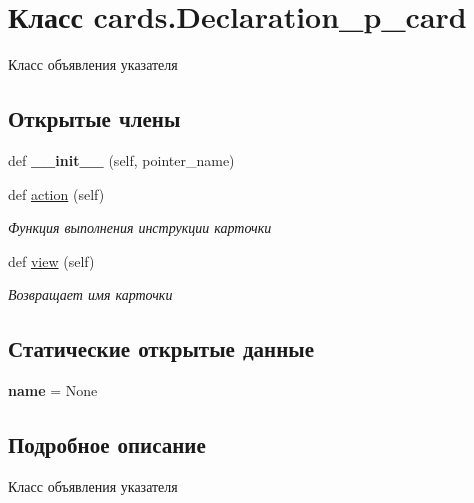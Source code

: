 \hypertarget{classcards_1_1_declaration__p__card}{}\section{Класс cards.\+Declaration\+\_\+p\+\_\+card}
\label{classcards_1_1_declaration__p__card}


Класс объявления указателя  


\subsection*{Открытые члены}
\begin{DoxyCompactItemize}
\item 
\mbox{\label{classcards_1_1_declaration__p__card_a8d22cbec1560a61c0ec4d7aa20b63a0b}} 
def {\bfseries \+\_\+\+\_\+init\+\_\+\+\_\+} (self, pointer\+\_\+name)
\item 
def \mbox{\hyperlink{classcards_1_1_declaration__p__card_a258fbc709567b0e19eb6b2c6f1c9664f}{action}} (self)
\begin{DoxyCompactList}\small\item\em Функция выполнения инструкции карточки \end{DoxyCompactList}\item 
def \mbox{\hyperlink{classcards_1_1_declaration__p__card_ade1c4873e4500e66bccf2a559195aad5}{view}} (self)
\begin{DoxyCompactList}\small\item\em Возвращает имя карточки \end{DoxyCompactList}\end{DoxyCompactItemize}
\subsection*{Статические открытые данные}
\begin{DoxyCompactItemize}
\item 
\mbox{\label{classcards_1_1_declaration__p__card_a90fd72af7e50c04a5b0fc531205156a5}} 
{\bfseries name} = None
\end{DoxyCompactItemize}


\subsection{Подробное описание}
Класс объявления указателя 


